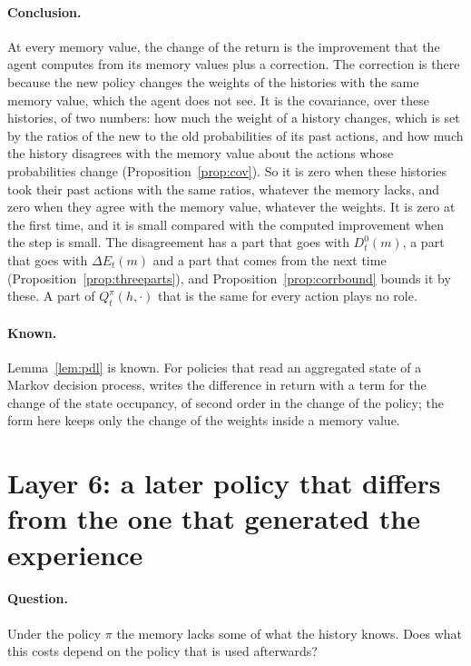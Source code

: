 \documentclass{article}
\theoremstyle{definition}
\numberwithin{equation}{section}
\newcommand{\dE}{\Delta E}
\begin{document}
\paragraph{Conclusion.} At every memory value, the change of the return is the improvement that the agent computes from its memory values plus a correction. The correction is there because the new policy changes the weights of the histories with the same memory value, which the agent does not see. It is the covariance, over these histories, of two numbers: how much the weight of a history changes, which is set by the ratios of the new to the old probabilities of its past actions, and how much the history disagrees with the memory value about the actions whose probabilities change (Proposition~\ref{prop:cov}). So it is zero when these histories took their past actions with the same ratios, whatever the memory lacks, and zero when they agree with the memory value, whatever the weights. It is zero at the first time, and it is small compared with the computed improvement when the step is small. The disagreement has a part that goes with $D^0_t(m)$, a part that goes with $\dE_t(m)$ and a part that comes from the next time (Proposition~\ref{prop:threeparts}), and Proposition~\ref{prop:corrbound} bounds it by these. A part of $Q^\pi_t(h,\cdot)$ that is the same for every action plays no role.

\paragraph{Known.} Lemma~\ref{lem:pdl} is known. For policies that read an aggregated state of a Markov decision process, \citet{russo2020approximation} writes the difference in return with a term for the change of the state occupancy, of second order in the change of the policy; the form here keeps only the change of the weights inside a memory value.

\section{Layer 6: a later policy that differs from the one that generated the experience}\label{sec:layer6}

\paragraph{Question.} Under the policy $\pi$ the memory lacks some of what the history knows. Does what this costs depend on the policy that is used afterwards?
\end{document}
